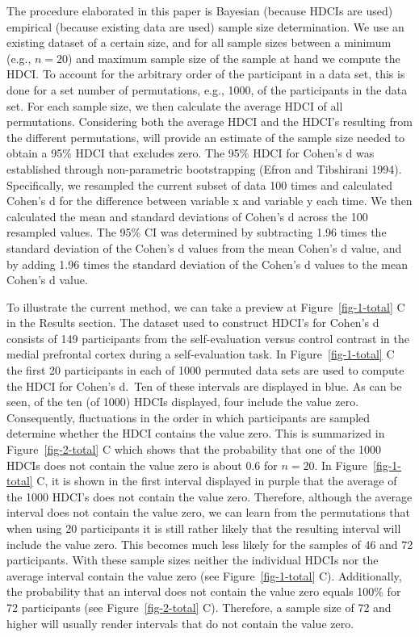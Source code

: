 \documentclass[
  letterpaper,
  DIV=11,
  numbers=noendperiod]{scrartcl}
\begin{document}
The procedure elaborated in this paper is Bayesian (because HDCIs are
used) empirical (because existing data are used) sample size
determination. We use an existing dataset of a certain size, and for all
sample sizes between a minimum (e.g., \(n = 20\)) and maximum sample
size of the sample at hand we compute the HDCI. To account for the
arbitrary order of the participant in a data set, this is done for a set
number of permutations, e.g., 1000, of the participants in the data set.
For each sample size, we then calculate the average HDCI of all
permutations. Considering both the average HDCI and the HDCI's resulting
from the different permutations, will provide an estimate of the sample
size needed to obtain a 95\% HDCI that excludes zero. The 95\% HDCI for
Cohen's d was established through non-parametric bootstrapping (Efron
and Tibshirani 1994). Specifically, we resampled the current subset of
data 100 times and calculated Cohen's d for the difference between
variable x and variable y each time. We then calculated the mean and
standard deviations of Cohen's d across the 100 resampled values. The
95\% CI was determined by subtracting 1.96 times the standard deviation
of the Cohen's d values from the mean Cohen's d value, and by adding
1.96 times the standard deviation of the Cohen's d values to the mean
Cohen's d value.

To illustrate the current method, we can take a preview at
Figure~\ref{fig-1-total} C in the Results section. The dataset used to
construct HDCI's for Cohen's d consists of 149 participants from the
self-evaluation versus control contrast in the medial prefrontal cortex
during a self-evaluation task. In Figure~\ref{fig-1-total} C the first
20 participants in each of 1000 permuted data sets are used to compute
the HDCI for Cohen's d.~Ten of these intervals are displayed in blue. As
can be seen, of the ten (of 1000) HDCIs displayed, four include the
value zero. Consequently, fluctuations in the order in which
participants are sampled determine whether the HDCI contains the value
zero. This is summarized in Figure~\ref{fig-2-total} C which shows that
the probability that one of the 1000 HDCIs does not contain the value
zero is about 0.6 for \(n = 20\). In Figure~\ref{fig-1-total} C, it is
shown in the first interval displayed in purple that the average of the
1000 HDCI's does not contain the value zero. Therefore, although the
average interval does not contain the value zero, we can learn from the
permutations that when using 20 participants it is still rather likely
that the resulting interval will include the value zero. This becomes
much less likely for the samples of 46 and 72 participants. With these
sample sizes neither the individual HDCIs nor the average interval
contain the value zero (see Figure~\ref{fig-1-total} C). Additionally,
the probability that an interval does not contain the value zero equals
100\% for 72 participants (see Figure~\ref{fig-2-total} C). Therefore, a
sample size of 72 and higher will usually render intervals that do not
contain the value zero.
\end{document}

